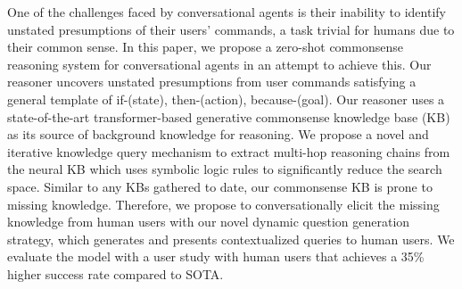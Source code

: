 One of the challenges faced by conversational agents is their inability to identify unstated presumptions of their users' commands, a task trivial for humans due to their common sense. In this paper, we propose a zero-shot commonsense reasoning system for conversational agents in an attempt to achieve this. Our reasoner uncovers unstated presumptions from user commands satisfying a general template of if-(state), then-(action), because-(goal). Our reasoner uses a state-of-the-art transformer-based generative commonsense knowledge base (KB) as its source of background knowledge for reasoning. We propose a novel and iterative knowledge query mechanism to extract multi-hop reasoning chains from the neural KB which uses symbolic logic rules to significantly reduce the search space. Similar to any KBs gathered to date, our commonsense KB is prone to missing knowledge. Therefore, we propose to conversationally elicit the missing knowledge from human users with our novel dynamic question generation strategy, which generates and presents contextualized queries to human users. We evaluate the model with a user study with human users that achieves a 35\% higher success rate compared to SOTA.
